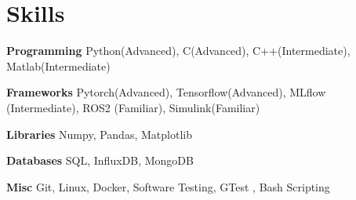 
\section{Skills}
  \vspace{2pt}
  \resumeSubHeadingListStart
    \small{\item{

    \textbf{\color{MidnightBlue}Programming}{ Python(Advanced), C(Advanced), C++(Intermediate), Matlab(Intermediate)} \\ \vspace{3pt} %

    \textbf{\color{MidnightBlue}Frameworks}{ Pytorch(Advanced), Tensorflow(Advanced), MLflow (Intermediate)}, ROS2 (Familiar), Simulink(Familiar)\\ \vspace{3pt}

    \textbf{\color{MidnightBlue}Libraries}{ Numpy, Pandas, Matplotlib} \\ \vspace{3pt} %


    \textbf{\color{MidnightBlue}Databases}{ SQL, InfluxDB, MongoDB} \\ \vspace{3pt}

    \textbf{\color{MidnightBlue}Misc}{ Git, Linux, Docker, Software Testing, GTest , Bash Scripting} \\ \vspace{3pt} %
            
    }}
  \resumeSubHeadingListEnd
